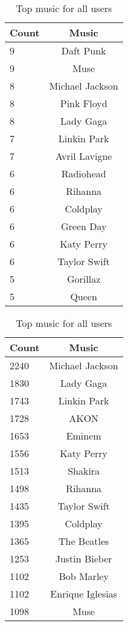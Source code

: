 \begin{table}[h]
\begin{minipage}[b]{.50\textwidth}
\centering
  \begin{tabular}{|l|c|} %
  \hline
  	\textbf{Count} & \textbf{Music} \\ \hline
		9 & Daft Punk \\ \hline
		9 & Muse \\ \hline
		8 & Michael Jackson \\ \hline
		8 & Pink Floyd \\ \hline
		8 & Lady Gaga \\ \hline
		7 & Linkin Park \\ \hline
		7 & Avril Lavigne \\ \hline
		6 & Radiohead \\ \hline
		6 & Rihanna \\ \hline
		6 & Coldplay \\ \hline
		6 & Green Day \\ \hline
		6 & Katy Perry \\ \hline
		6 & Taylor Swift \\ \hline
		5 & Gorillaz \\ \hline
		5 & Queen \\ \hline
  \end{tabular}
  \caption{Top music for app users}
\end{minipage}
\begin{minipage}[b]{.50\textwidth}
\centering
  \begin{tabular}{|l|c|} %
  \hline
  		\textbf{Count} & \textbf{Music} \\ \hline
		2240 & Michael Jackson \\ \hline
		1830 & Lady Gaga \\ \hline
		1743 & Linkin Park \\ \hline
		1728 & AKON \\ \hline
		1653 & Eminem \\ \hline
		1556 & Katy Perry \\ \hline
		1513 & Shakira \\ \hline
		1498 & Rihanna \\ \hline
		1435 & Taylor Swift \\ \hline
		1395 & Coldplay \\ \hline
		1365 & The Beatles \\ \hline
		1253 & Justin Bieber \\ \hline
		1102 & Bob Marley \\ \hline
		1102 & Enrique Iglesias \\ \hline
		1098 & Muse \\ \hline
  \end{tabular}
  \caption{Top music for all users}
\end{minipage}
\end{table}



